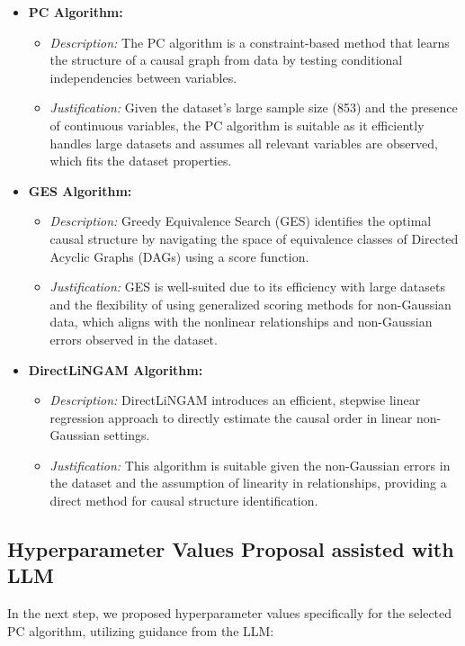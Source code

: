 \documentclass{article}
\begin{document}
\begin{itemize}
\item \textbf{PC Algorithm:} 
  \begin{itemize}
  \item \textit{Description:} The PC algorithm is a constraint-based method that learns the structure of a causal graph from data by testing conditional independencies between variables.
  \item \textit{Justification:} Given the dataset's large sample size (853) and the presence of continuous variables, the PC algorithm is suitable as it efficiently handles large datasets and assumes all relevant variables are observed, which fits the dataset properties.
  \end{itemize}

\item \textbf{GES Algorithm:}
  \begin{itemize}
  \item \textit{Description:} Greedy Equivalence Search (GES) identifies the optimal causal structure by navigating the space of equivalence classes of Directed Acyclic Graphs (DAGs) using a score function.
  \item \textit{Justification:} GES is well-suited due to its efficiency with large datasets and the flexibility of using generalized scoring methods for non-Gaussian data, which aligns with the nonlinear relationships and non-Gaussian errors observed in the dataset.
  \end{itemize}

\item \textbf{DirectLiNGAM Algorithm:}
  \begin{itemize}
  \item \textit{Description:} DirectLiNGAM introduces an efficient, stepwise linear regression approach to directly estimate the causal order in linear non-Gaussian settings.
  \item \textit{Justification:} This algorithm is suitable given the non-Gaussian errors in the dataset and the assumption of linearity in relationships, providing a direct method for causal structure identification.
  \end{itemize}
\end{itemize}

\subsection{Hyperparameter Values Proposal assisted with LLM}
In the next step, we proposed hyperparameter values specifically for the selected PC algorithm, utilizing guidance from the LLM:
\end{document}
